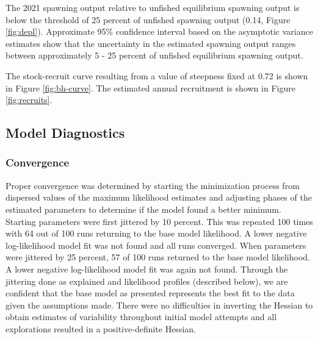 \documentclass[11pt,
  english,
  letterpaper,
]{article}
\begin{document}
\leavevmode\tagmcend\tagstructend\par


The 2021 spawning output relative to unfished equilibrium spawning output is below the threshold of 25 percent of unfished spawning output (0.14, Figure \ref{fig:depl}). Approximate 95\% confidence interval based on the asymptotic variance estimates show that the uncertainty in the estimated spawning output ranges between approximately 5 - 25 percent of unfished equilibrium spawning output.

\leavevmode\tagmcend\tagstructend\par


The stock-recruit curve resulting from a value of steepness fixed at 0.72 is shown in Figure \ref{fig:bh-curve}. The estimated annual recruitment is shown in Figure \ref{fig:recruits}.

\leavevmode\tagmcend\tagstructend\par


\hypertarget{model-diagnostics}{%
\subsection{Model Diagnostics}\label{model-diagnostics}}

\leavevmode\tagmcend\tagstructend


\hypertarget{convergence}{%
\subsubsection{Convergence}\label{convergence}}

\leavevmode\tagmcend\tagstructend


Proper convergence was determined by starting the minimization process from dispersed values of the maximum likelihood estimates and adjusting phases of the estimated parameters to determine if the model found a better minimum. Starting parameters were first jittered by 10 percent. This was repeated 100 times with 64 out of 100 runs returning to the base model likelihood. A lower negative log-likelihood model fit was not found and all runs converged. When parameters were jittered by 25 percent, 57 of 100 runs returned to the base model likelihood. A lower negative log-likelihood model fit was again not found. Through the jittering done as explained and likelihood profiles (described below), we are confident that the base model as presented represents the best fit to the data given the assumptions made. There were no difficulties in inverting the Hessian to obtain estimates of variability throughout initial model attempts and all explorations resulted in a positive-definite Hessian.
\end{document}
